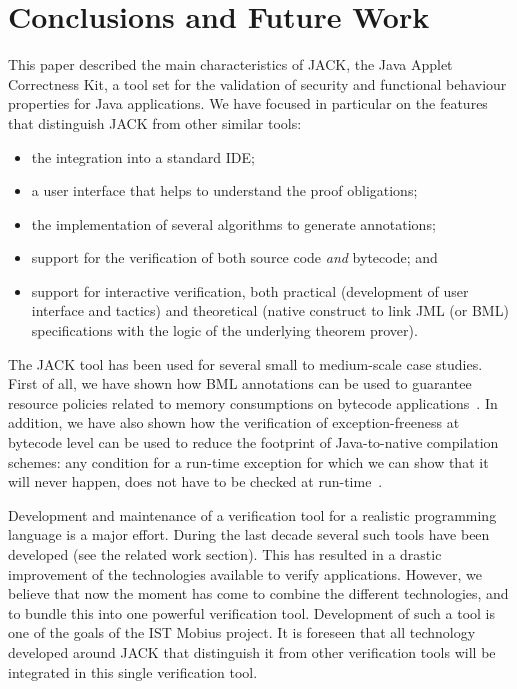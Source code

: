 \section{Conclusions and Future Work}\label{SecConcl}

This paper described the main characteristics of JACK, the Java Applet
Correctness Kit, a tool set for the validation of security and
functional behaviour properties for Java applications. We have focused
in particular on the features that distinguish JACK from other similar
tools:
\begin{itemize}
\item the integration into a standard IDE;
\item a user interface that helps to understand the proof obligations;
\item the implementation of several algorithms to generate
annotations;
\item support for the verification of both source code \emph{and}
bytecode; and
\item support for interactive verification, both practical
(development of user interface and tactics) and theoretical (native
construct to link JML (or BML) specifications with the logic of the
underlying theorem prover).
\end{itemize}

The JACK tool has been used for several small to medium-scale case
studies. First of all, we have shown how BML annotations can be used
to guarantee resource policies related to memory consumptions on
bytecode applications~\cite{gmg05:sefm}. In addition, we have also
shown how the verification of exception-freeness at bytecode level can
be used to reduce the footprint of Java-to-native compilation schemes:
any condition for a run-time exception for which we can show that it
will never happen, does not have to be checked at
run-time~\cite{DBLP:conf/cardis/CourbotPGV06}.


Development and maintenance of a verification tool for a realistic
programming language is a major effort. During the last decade several
such tools have been developed (see the related work section). This
has resulted in a drastic improvement of the technologies available to
verify applications. However, we believe that now the moment has come
to combine the different technologies, and to bundle this into one
powerful verification tool. Development of such a tool is one of the
goals of the IST \textsf{Mobius} project. It is foreseen that all technology
developed around JACK that distinguish it from other verification
tools will be integrated in this single verification tool. 

